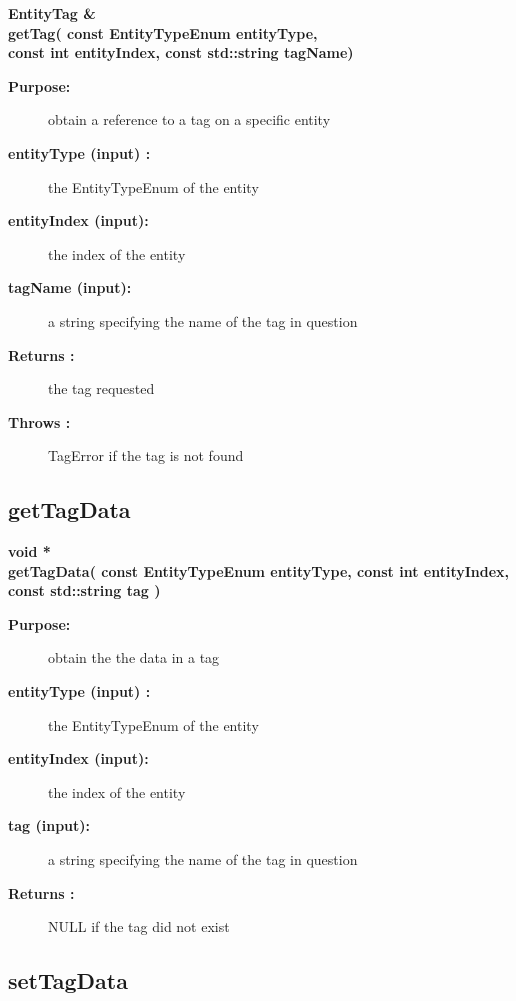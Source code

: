 \begin{flushleft} \textbf{%
EntityTag \& \\ 
\settowidth{\UnstructuredMappingIncludeArgIndent}{getTag(}%
getTag( const  EntityTypeEnum entityType, \\ 
\hspace{\UnstructuredMappingIncludeArgIndent}const int entityIndex, const std::string tagName)
}\end{flushleft}
\begin{description}
\item[{\bf Purpose:}]  
    obtain a reference to a tag on a specific entity
\item[{\bf entityType (input) :}]  the EntityTypeEnum of the entity
\item[{\bf entityIndex (input):}]  the index of the entity
\item[{\bf tagName    (input):}]  a string specifying the name of the tag in question
\item[{\bf Returns :}]  the tag requested
\item[{\bf Throws :}]  TagError if the tag is not found
\end{description}
\subsection{getTagData}
 
\begin{flushleft} \textbf{%
void *  \\ 
\settowidth{\UnstructuredMappingIncludeArgIndent}{getTagData(}%
getTagData( const  EntityTypeEnum entityType, const int entityIndex, \\ 
\hspace{\UnstructuredMappingIncludeArgIndent}const std::string tag )
}\end{flushleft}
\begin{description}
\item[{\bf Purpose:}]  
    obtain the the data in a tag
\item[{\bf entityType (input) :}]  the EntityTypeEnum of the entity
\item[{\bf entityIndex (input):}]  the index of the entity
\item[{\bf tag    (input):}]  a string specifying the name of the tag in question
\item[{\bf Returns :}]  NULL if the tag did not exist
\end{description}
\subsection{setTagData}
 
